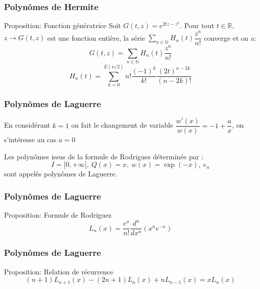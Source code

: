 \documentclass[xcolor=dvipsnames,10pt,mathserif]{beamer}
\theoremstyle{plain}
\newcommand{\R}{\mathbb{R}}
\newcommand{\N}{\mathbb{N}}
\begin{document}
\begin{frame}\frametitle{Polynômes de Hermite \hfill \insertpagenumber}
\begin{block}{Proposition: Fonction génératrice}
Soit $ G(t,z)=e^{2tz-z^{2}}$. Pour tout $ t\in \R $, $ z\rightarrow G(t,z) $ est une fonction entière, la série $ \displaystyle{\sum\limits_{n \in \N}H_{n}(t)\dfrac{z^{n}}{n!}} $ converge et on a:
\begin{equation}
\displaystyle{G(t,z)=\sum\limits_{n \in \N}H_{n}(t)\dfrac{z^{n}}{n!}}
\end{equation}
\begin{equation}
\displaystyle{H_{n}(t) = \sum\limits_{k=0}^{E(n/2)}n!\dfrac{(-1)^{k}}{k!}\dfrac{(2t)^{n-2k}}{(n-2k)!}}
\end{equation}
\end{block}
\end{frame}


\begin{frame}\frametitle{Polynômes de Laguerre \hfill \insertpagenumber}
En considérant $k=1$ on fait le changement de variable $\dfrac{w'(x)}{w(x)}=-1+\dfrac{a}{x}$, on s'intéresse au cas $a=0$
\begin{block}{}
Les polynômes issus de la formule de Rodrigues déterminée par : 
\begin{equation}
I=[0, +\infty[,\ Q(x)=x,\ w(x)=\exp(-x),\ e_{n}
\end{equation}
sont appelés polynômes de Laguerre.
\end{block}
\end{frame}


\begin{frame}\frametitle{Polynômes de Laguerre \hfill \insertpagenumber}
\begin{block}{Proposition: Formule de Rodriguez}
\begin{equation}
L_n(x)= \dfrac{e^x}{n!} \dfrac{d^n}{dx^n}(x^n e^{-x})
\end{equation}
\end{block}
\end{frame}


\begin{frame}\frametitle{Polynômes de Laguerre \hfill \insertpagenumber}
\begin{block}{Proposition: Relation de récurrence}
\begin{equation}
(n+1)L_{n+1}(x)-(2n+1)L_n(x)+nL_{n-1}(x)=xL_n(x)
\end{equation}
\end{block}
\end{frame}
\end{document}
